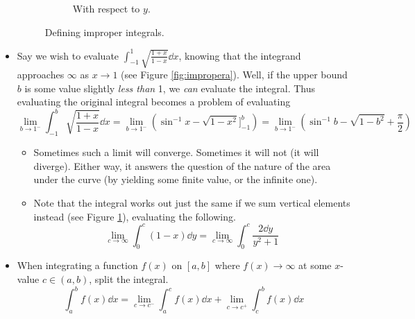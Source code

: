 \documentclass[../main.tex]{subfiles}
\begin{document}
\begin{itemize}
\begin{figure}[h!]
\begin{subfigure}[b]{0.48\linewidth}
            \caption{With respect to $y$.}
            \label{fig:improperb}
        \end{subfigure}
        \caption{Defining improper integrals.}
        \label{fig:improper}
    \end{figure}
    \item Say we wish to evaluate $\int_{-1}^1\sqrt{\frac{1+x}{1-x}}\dd{x}$, knowing that the integrand approaches $\infty$ as $x\to 1$ (see Figure \ref{fig:impropera}). Well, if the upper bound $b$ is some value slightly \emph{less than} 1, we \emph{can} evaluate the integral. Thus evaluating the original integral becomes a problem of evaluating
    \begin{equation*}
        \lim_{b\to 1^-}\int_{-1}^b\sqrt{\frac{1+x}{1-x}}\dd{x} = \lim_{b\to 1^-}\left( \sin^{-1}x-\sqrt{1-x^2}\Big]_{-1}^b \right)
        = \lim_{b\to 1^-}\left( \sin^{-1}b-\sqrt{1-b^2}+\frac{\pi}{2} \right)
    \end{equation*}
    \begin{itemize}
        \item Sometimes such a limit will converge. Sometimes it will not (it will diverge). Either way, it answers the question of the nature of the area under the curve (by yielding some finite value, or the infinite one).
        \item Note that the integral works out just the same if we sum vertical elements instead (see Figure \ref{fig:improperb}), evaluating the following.
        \begin{equation*}
            \lim_{c\to\infty}\int_0^c(1-x)\dd{y} = \lim_{c\to\infty}\int_0^c\frac{2\dd{y}}{y^2+1}
        \end{equation*}
    \end{itemize}
    \item When integrating a function $f(x)$ on $[a,b]$ where $f(x)\to\infty$ at some $x$-value $c\in(a,b)$, split the integral.
    \begin{equation*}
        \int_a^b f(x)\dd{x} = \lim_{c\to c^-}\int_a^c f(x)\dd{x}+\lim_{c\to c^+}\int_c^b f(x)\dd{x}

\end{equation*}
\end{itemize}
\end{document}
